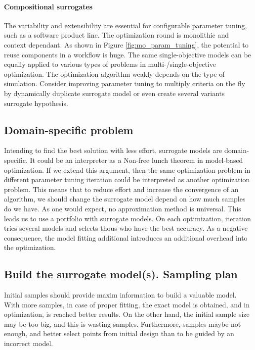     
            \paragraph{Compositional surrogates}
            The variability and extensibility are essential for configurable parameter tuning, such as a software product line. The optimization round is monolithic and context dependant. As shown in Figure \ref{fig:mo_param_tuning}, the potential to reuse components in a workflow is huge. The same single-objective models can be equally applied to various types of problems in multi-/single-objective optimization. The optimization algorithm weakly depends on the type of simulation. 
            Consider improving parameter tuning to multiply criteria on the fly by dynamically duplicate surrogate model or even create several variants surrogate hypothesis.

        \subsection{Domain-specific problem}
        Intending to find the best solution with less effort, surrogate models are domain-specific. It could be an interpreter as a Non-free lunch theorem in model-based optimization. If we extend this argument, then the same optimization problem in different parameter tuning iteration could be interpreted as another optimization problem. This means that to reduce effort and increase the convergence of an algorithm, we should change the surrogate model depend on how much samples do we have. As one would expect, no approximation method is universal.
        This leads us to use a portfolio with surrogate models. On each optimization, iteration tries several models and selects thous who have the best accuracy. As a negative consequence, the model fitting additional introduces an additional overhead into the optimization.


        \subsection{Build the surrogate model(s). Sampling plan}
        Initial samples should provide maxim information to build a valuable model. With more samples, in case of proper fitting, the exact model is obtained, and in optimization, is reached better results. On the other hand, the initial sample size may be too big, and this is wasting samples. Furthermore, samples maybe not enough, and better select points from initial design than to be guided by an incorrect model.

